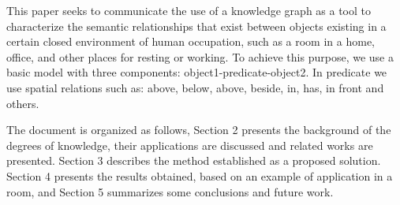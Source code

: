 This paper seeks to communicate the use of a knowledge graph as a tool to 
characterize the semantic relationships that exist between objects existing 
in a certain closed environment of human occupation, such as a room in a home, 
office, and other places for resting or working. To achieve this purpose, we use 
a basic model with three components: object1-predicate-object2. 
In predicate we use spatial relations such as: above, below, 
above, beside, in, has, in front and others.

The document is organized as follows, Section 2 presents the background of the 
degrees of knowledge, their applications are discussed and related works are 
presented. Section 3 describes the method established as a proposed solution. 
Section 4 presents the results obtained, based on an example of application in 
a room, and Section 5 summarizes some conclusions and future work.
